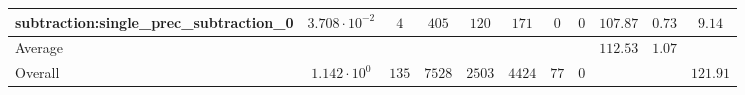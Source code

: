 \begin{tabular}{|l|c|c|c|c|c|c|c|c|c|c|}
subtraction:single\_prec\_subtraction\_0         & $ 3.708 \cdot 10^{-2} $ & $ 4      $ & $ 405  $ & $ 120  $ & $ 171   $ & $ 0  $ & $ 0 $ & $ 107.87      $ & $ 0.73    $ & $ 9.14    $ \\
\hline
Average                                          & $                     $ & $        $ & $      $ & $      $ & $       $ & $    $ & $   $ & $ 112.53      $ & $ 1.07    $ & $         $ \\
\hline
Overall                                          & $ 1.142 \cdot 10^{0}  $ & $ 135    $ & $ 7528 $ & $ 2503 $ & $ 4424  $ & $ 77 $ & $ 0 $ & $             $ & $         $ & $ 121.91  $ \\
\hline
\end{tabular}
